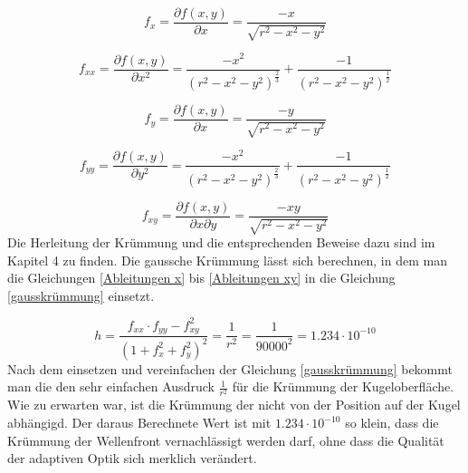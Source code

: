 \begin{refsection}
\begin{equation}\label{Ableitungen x}
f_{x}=\dfrac{\partial f(x,y)}{\partial x}= \dfrac{-x}{\sqrt{r^{2}-x^{2}-y^{2}}}
\end{equation}

\begin{equation}\label{Ableitungen xx}
f_{xx}=\dfrac{\partial f(x,y)}{\partial x^{2}}= \dfrac{- x^2}{(r^2 - x^2 - y^2)^{\frac{2}{3}}}+\dfrac{ - 1}{(r^2 - x^2 - y^2)^{\frac{1}{2}}}
\end{equation}

\begin{equation}\label{Ableitungen y}
f_{y} =\dfrac{\partial f(x,y)}{\partial x}= \dfrac{-y}{\sqrt{r^{2}-x^{2}-y^{2}}}
\end{equation}

\begin{equation}\label{Ableitungen yy}
f_{yy}=\dfrac{\partial f(x,y)}{\partial y^{2}}= \dfrac{- x^2}{(r^2 - x^2 - y^2)^{\frac{2}{3}}}+\dfrac{ - 1}{(r^2 - x^2 - y^2)^{\frac{1}{2}}}
\end{equation}

\begin{equation}\label{Ableitungen xy}
f_{xy}=\dfrac{\partial f(x,y)}{\partial x \partial y}=  \dfrac{-xy}{\sqrt{r^{2}-x^{2}-y^{2}}}
\end{equation}
Die Herleitung der Krümmung und die entsprechenden Beweise dazu sind im Kapitel 4 zu finden. Die gaussche Krümmung lässt sich berechnen, in dem man die Gleichungen \eqref{Ableitungen x} bis \eqref{Ableitungen xy} in die Gleichung \eqref{gausskrümmung} einsetzt.  

\begin{equation}\label{gausskrümmung}
h = \dfrac{f_{xx} \cdot f_{yy} -f_{xy}^{2}}{(1+f_{x}^{2}+f_{y}^{2})^{2}} = \dfrac{1}{r^{2}} =\dfrac{1}{90000^{2}} = 1.234\cdot 10^{-10}
\end{equation}
Nach dem einsetzen und vereinfachen der Gleichung \eqref{gausskrümmung} bekommt man die den sehr einfachen Ausdruck $\frac{1}{r^{2}}$ für die Krümmung der Kugeloberfläche. Wie zu erwarten war, ist die Krümmung der nicht von der Position auf der Kugel abhängigd. 
Der daraus Berechnete Wert ist mit $1.234\cdot 10^{-10}$ so klein, dass die Krümmung der Wellenfront vernachlässigt werden darf, ohne dass die Qualität der adaptiven Optik sich merklich verändert.



\printbibliography[heading=subbibliography]
\end{refsection}














